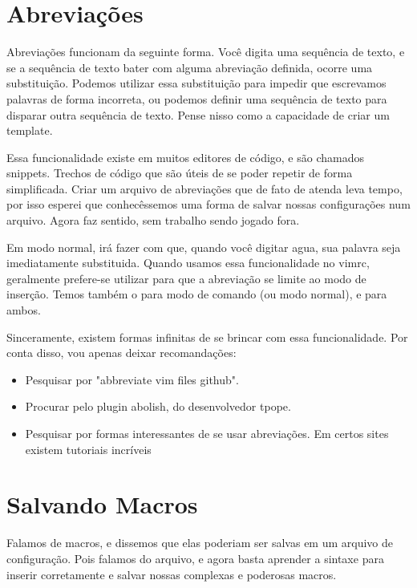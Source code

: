 
\section{Abreviações}
Abreviações funcionam da seguinte forma.
Você digita uma sequência de texto, e se a sequência de texto bater com alguma abreviação definida, ocorre uma substituição.
Podemos utilizar essa substituição para impedir que escrevamos palavras de forma incorreta, ou podemos definir uma sequência de texto
para disparar outra sequência de texto.
Pense nisso como a capacidade de criar um template.

Essa funcionalidade existe em muitos editores de código, e são chamados snippets.
Trechos de código que são úteis de se poder repetir de forma simplificada.
Criar um arquivo de abreviações que de fato de atenda leva tempo, por isso esperei que conhecêssemos uma forma
de salvar nossas configurações num arquivo.
Agora faz sentido, sem trabalho sendo jogado fora.

Em modo normal,  irá fazer com que, quando você digitar agua, sua palavra seja imediatamente substituida.
Quando usamos essa funcionalidade no vimrc, geralmente prefere-se utilizar 
para que a abreviação se limite ao modo de inserção.
Temos também o  para modo de comando (ou modo normal), e  para ambos.

Sinceramente, existem formas infinitas de se brincar com essa funcionalidade.
Por conta disso, vou apenas deixar recomandações:
\begin{itemize}
	\item Pesquisar por "abbreviate vim files github".
	\item Procurar pelo plugin abolish, do desenvolvedor tpope.
	\item Pesquisar por formas interessantes de se usar abreviações. Em certos sites existem tutoriais incríveis
\end{itemize}

\section{Salvando Macros}
Falamos de macros, e dissemos que elas poderiam ser salvas em um arquivo de configuração.
Pois falamos do arquivo, e agora basta aprender a sintaxe para inserir corretamente e salvar nossas complexas e poderosas macros.


